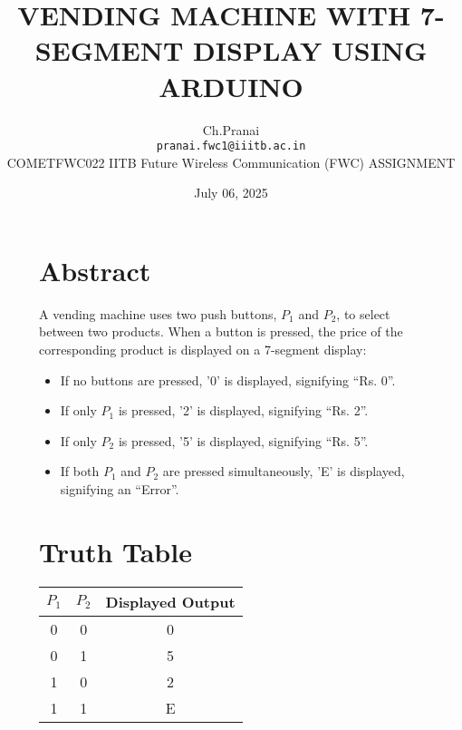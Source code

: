 \documentclass[12pt,a4paper]{article}
\title{\textbf{VENDING MACHINE WITH 7-SEGMENT DISPLAY USING ARDUINO}}
\author{Ch.Pranai \\ \texttt{pranai.fwc1@iiitb.ac.in} \\  \hspace{-0.5cm }COMETFWC022 \hspace{0.4cm}IITB Future Wireless Communication (FWC) \hspace{0.2cm}     ASSIGNMENT}
\date{July 06, 2025}
\begin{document}
\maketitle

\begin{figure}[H]
  \centering
  \begin{minipage}[t]{0.48\textwidth}
    \section*{Abstract}
    \small
    A vending machine uses two push buttons, $P_1$ and $P_2$, to select between two products. When a button is pressed, the price of the corresponding product is displayed on a 7-segment display:

    \begin{itemize}
        \item If no buttons are pressed, '0' is displayed, signifying ``Rs. 0''.
        \item If only $P_1$ is pressed, '2' is displayed, signifying ``Rs. 2''.
        \item If only $P_2$ is pressed, '5' is displayed, signifying ``Rs. 5''.
        \item If both $P_1$ and $P_2$ are pressed simultaneously, 'E' is displayed, signifying an ``Error''.
    \end{itemize}

    \vspace{0.5cm}

    \section*{Truth Table}

    \renewcommand{\arraystretch}{1.3}
    \begin{tabular}{|c|c|c|}
      \hline
      $P_1$ & $P_2$ & Displayed Output \\ \hline
      0 & 0 & 0 \\ \hline
      0 & 1 & 5 \\ \hline
      1 & 0 & 2 \\ \hline
      1 & 1 & E \\ \hline
    \end{tabular}
  \end{minipage}\hfill
  \begin{minipage}[t]{0.48\textwidth}

\end{minipage}
\end{figure}
\end{document}
